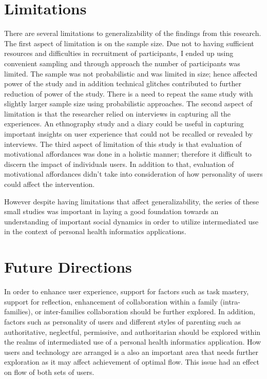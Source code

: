 \section{Limitations}
There are several limitations to generalizability of the findings from this research. The first aspect of limitation is on the sample size. Due not to having sufficient resources and difficulties in recruitment of participants, I ended up using convenient sampling and through approach the number of participants was limited. The sample was not probabilistic and was limited in size; hence affected power of the study and in addition technical glitches contributed to further reduction of power of the study. There is a need to repeat the same study with slightly larger sample size using probabilistic approaches.   The second aspect of limitation is that the researcher relied on interviews in capturing all the experiences. An ethnography study and a diary could be useful in capturing important insights on user experience that could not be recalled or revealed by interviews. The third aspect of limitation of this study is that evaluation of motivational affordances was done in a holistic manner; therefore it difficult to discern the impact of individuals users. In addition to that, evaluation of motivational affordances didn't take into consideration of how personality of users could affect the intervention.  

However despite having limitations that affect generalizability, the series of these small studies was important in laying a good foundation towards an understanding of important social dynamics in order to utilize intermediated use in the context of personal health informatics applications.

\section{Future Directions}
In order to enhance user experience, support for factors such as task mastery, support for reflection, enhancement of collaboration within a family (intra-families), or inter-families collaboration should be further explored. In addition, factors such as personality of users and different styles of parenting such as authoritative, neglectful, permissive, and authoritarian should be explored within the realms of intermediated use of a personal health informatics application. How users and technology are arranged is a also an important area that needs further exploration as it may affect achievement of  optimal flow. This issue had an effect on flow of both sets of users. 

